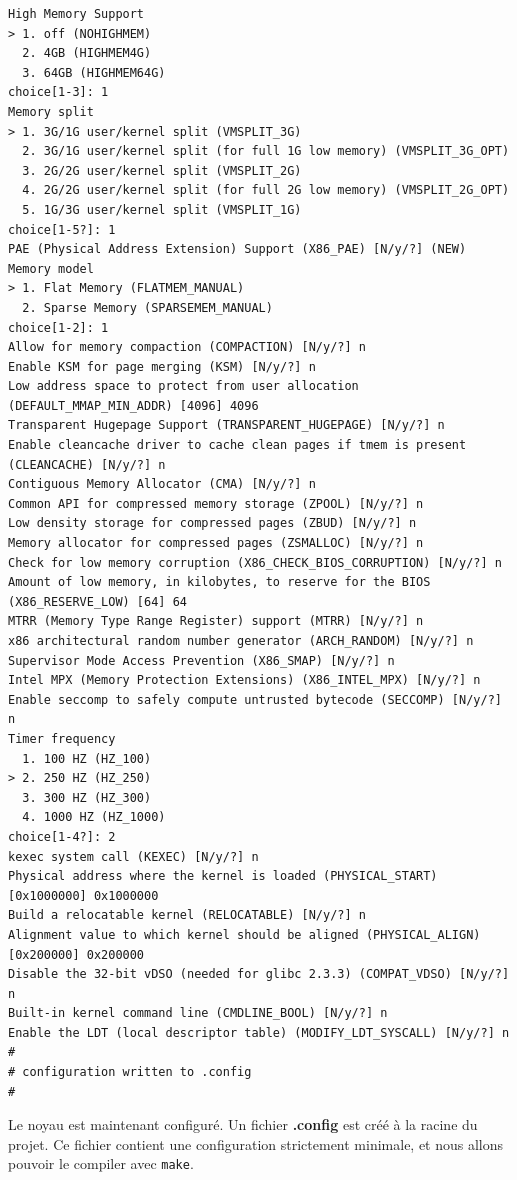 \documentclass[a4paper]{article}
\begin{document}
\begin{verbatim}
High Memory Support
> 1. off (NOHIGHMEM)
  2. 4GB (HIGHMEM4G)
  3. 64GB (HIGHMEM64G)
choice[1-3]: 1
Memory split
> 1. 3G/1G user/kernel split (VMSPLIT_3G)
  2. 3G/1G user/kernel split (for full 1G low memory) (VMSPLIT_3G_OPT)
  3. 2G/2G user/kernel split (VMSPLIT_2G)
  4. 2G/2G user/kernel split (for full 2G low memory) (VMSPLIT_2G_OPT)
  5. 1G/3G user/kernel split (VMSPLIT_1G)
choice[1-5?]: 1
PAE (Physical Address Extension) Support (X86_PAE) [N/y/?] (NEW) 
Memory model
> 1. Flat Memory (FLATMEM_MANUAL)
  2. Sparse Memory (SPARSEMEM_MANUAL)
choice[1-2]: 1
Allow for memory compaction (COMPACTION) [N/y/?] n
Enable KSM for page merging (KSM) [N/y/?] n
Low address space to protect from user allocation (DEFAULT_MMAP_MIN_ADDR) [4096] 4096
Transparent Hugepage Support (TRANSPARENT_HUGEPAGE) [N/y/?] n
Enable cleancache driver to cache clean pages if tmem is present (CLEANCACHE) [N/y/?] n
Contiguous Memory Allocator (CMA) [N/y/?] n
Common API for compressed memory storage (ZPOOL) [N/y/?] n
Low density storage for compressed pages (ZBUD) [N/y/?] n
Memory allocator for compressed pages (ZSMALLOC) [N/y/?] n
Check for low memory corruption (X86_CHECK_BIOS_CORRUPTION) [N/y/?] n
Amount of low memory, in kilobytes, to reserve for the BIOS (X86_RESERVE_LOW) [64] 64
MTRR (Memory Type Range Register) support (MTRR) [N/y/?] n
x86 architectural random number generator (ARCH_RANDOM) [N/y/?] n
Supervisor Mode Access Prevention (X86_SMAP) [N/y/?] n
Intel MPX (Memory Protection Extensions) (X86_INTEL_MPX) [N/y/?] n
Enable seccomp to safely compute untrusted bytecode (SECCOMP) [N/y/?] n
Timer frequency
  1. 100 HZ (HZ_100)
> 2. 250 HZ (HZ_250)
  3. 300 HZ (HZ_300)
  4. 1000 HZ (HZ_1000)
choice[1-4?]: 2
kexec system call (KEXEC) [N/y/?] n
Physical address where the kernel is loaded (PHYSICAL_START) [0x1000000] 0x1000000
Build a relocatable kernel (RELOCATABLE) [N/y/?] n
Alignment value to which kernel should be aligned (PHYSICAL_ALIGN) [0x200000] 0x200000
Disable the 32-bit vDSO (needed for glibc 2.3.3) (COMPAT_VDSO) [N/y/?] n
Built-in kernel command line (CMDLINE_BOOL) [N/y/?] n
Enable the LDT (local descriptor table) (MODIFY_LDT_SYSCALL) [N/y/?] n
#
# configuration written to .config
#
\end{verbatim}

Le noyau est maintenant configuré. Un fichier \textbf{.config} est créé à la racine du projet. Ce fichier contient une configuration strictement minimale, et nous allons pouvoir le compiler avec \lstset{language=sh}\lstinline{make}.\\
\end{document}
